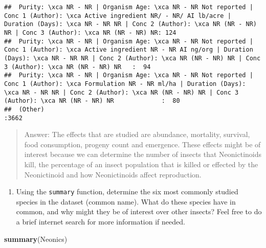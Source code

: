 \documentclass[]{article}
\newenvironment{Shaded}{\begin{snugshade}}{\end{snugshade}}
\newcommand{\KeywordTok}[1]{\textcolor[rgb]{0.13,0.29,0.53}{\textbf{#1}}}
\newcommand{\NormalTok}[1]{#1}
\providecommand{\tightlist}{%
  \setlength{\itemsep}{0pt}\setlength{\parskip}{0pt}}
\begin{document}
\begin{verbatim}
##  Purity: \xca NR - NR | Organism Age: \xca NR - NR Not reported | Conc 1 (Author): \xca Active ingredient NR/ - NR/ AI lb/acre | Duration (Days): \xca NR - NR NR | Conc 2 (Author): \xca NR (NR - NR) NR | Conc 3 (Author): \xca NR (NR - NR) NR: 124  
##  Purity: \xca NR - NR | Organism Age: \xca NR - NR Not reported | Conc 1 (Author): \xca Active ingredient NR - NR AI ng/org | Duration (Days): \xca NR - NR NR | Conc 2 (Author): \xca NR (NR - NR) NR | Conc 3 (Author): \xca NR (NR - NR) NR   :  94  
##  Purity: \xca NR - NR | Organism Age: \xca NR - NR Not reported | Conc 1 (Author): \xca Formulation NR - NR ml/ha | Duration (Days): \xca NR - NR NR | Conc 2 (Author): \xca NR (NR - NR) NR | Conc 3 (Author): \xca NR (NR - NR) NR             :  80  
##  (Other)                                                                                                                                                                                                                                         :3662
\end{verbatim}

\begin{quote}
Answer: The effects that are studied are abundance, mortality, survival,
food consumption, progeny count and emergence. These effects might be of
interest because we can determine the number of insects that
Neonictinoids kill, the percentage of an insect population that is
killed or effected by the Neonictinoid and how Neonictinoids affect
reproduction.
\end{quote}

\begin{enumerate}
\def\labelenumi{\arabic{enumi}.}
\setcounter{enumi}{6}
\tightlist
\item
  Using the \texttt{summary} function, determine the six most commonly
  studied species in the dataset (common name). What do these species
  have in common, and why might they be of interest over other insects?
  Feel free to do a brief internet search for more information if
  needed.
\end{enumerate}

\begin{Shaded}
\begin{Highlighting}[]
\KeywordTok{summary}\NormalTok{(Neonics)}
\end{Highlighting}
\end{Shaded}
\end{document}
